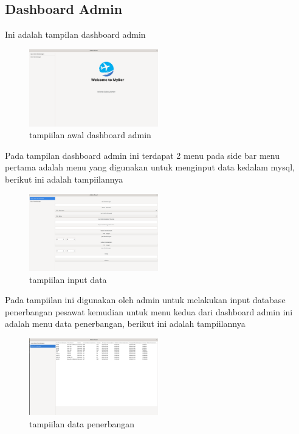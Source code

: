 \documentclass[a4paper,12pt]{article}
\begin{document}
\subsection{Dashboard Admin}
Ini adalah tampilan dashboard admin
\begin{figure}[!htbp]
    \centering
    \includegraphics[width=0.5\textwidth]{./img/dashboard_admin/tampilan_awal.png}
    \caption{tampiilan awal dashboard admin}
\end{figure}
\FloatBarrier
Pada tampilan dashboard admin ini terdapat 2 menu pada side bar menu pertama adalah menu yang digunakan untuk menginput data kedalam mysql,
berikut ini adalah tampiilannya
\begin{figure}[!htbp]
    \centering
    \includegraphics[width=0.5\textwidth]{./img/dashboard_admin/input_data_tampilan.png}
    \caption{tampiilan input data}
\end{figure}
\FloatBarrier
Pada tampiilan ini digunakan oleh admin untuk melakukan input database penerbangan pesawat
kemudian untuk menu kedua dari dashboard admin ini adalah menu data penerbangan, berikut ini adalah tampiilannya
\begin{figure}[!htbp]
    \centering
    \includegraphics[width=0.5\textwidth]{./img/dashboard_admin/data_penerbangan_tampilan.png}
    \caption{tampiilan data penerbangan}

\end{figure}
\end{document}
